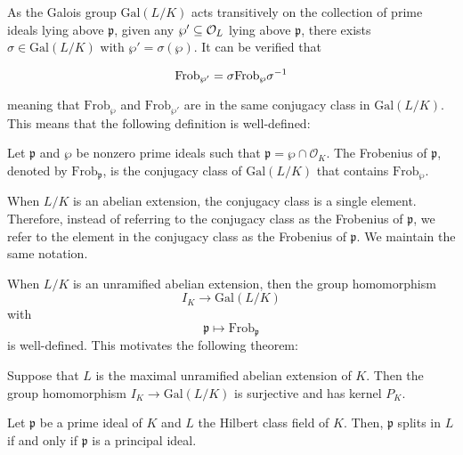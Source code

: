 As the Galois group $\textrm{Gal}(L/K)$ acts transitively on the collection of prime ideals lying above $\mathfrak{p}$, given any $\wp' \subseteq \mathcal{O}_{L}$ lying above $\mathfrak{p}$, there exists $\sigma \in \textrm{Gal}(L/K)$ with $\wp' = \sigma(\wp)$. It can be verified that

\[\textrm{Frob}_{\wp'} = \sigma \textrm{Frob}_\wp\sigma^{-1}\]

meaning that $\textrm{Frob}_{\wp}$ and $\textrm{Frob}_{\wp'}$ are in the same conjugacy class in $\textrm{Gal}(L/K)$. This means that the following definition is well-defined:

\begin{definition}
    Let $\mathfrak{p}$ and $\wp$ be nonzero prime ideals such that $\mathfrak{p} = \wp\cap \mathcal{O}_{K}$. The Frobenius of $\mathfrak{p}$, denoted by $\textrm{Frob}_{\mathfrak{p}}$, is the conjugacy class of $\textrm{Gal}(L/K)$ that contains $\textrm{Frob}_\wp$.
\end{definition}

When $L/K$ is an abelian extension, the conjugacy class is a single element. Therefore, instead of referring to the conjugacy class as the Frobenius of $\mathfrak{p}$, we refer to the element in the conjugacy class as the Frobenius of $\mathfrak{p}$. We maintain the same notation.

When $L/K$ is an unramified abelian extension, then the group homomorphism
    \[I_K \to \textrm{Gal}(L/K)\]
with
    \[\mathfrak{p} \mapsto \textrm{Frob}_{\mathfrak{p}}\]
is well-defined. This motivates the following theorem:

\begin{theorem}
    Suppose that $L$ is the maximal unramified abelian extension of $K$. Then the group homomorphism $I_K \to \textrm{Gal}(L/K)$ is surjective and has kernel $P_K$.
\end{theorem}

\begin{corollary}
    Let $\mathfrak{p}$ be a prime ideal of $K$ and $L$ the Hilbert class field of $K$. Then, $\mathfrak{p}$ splits in $L$ if and only if $\mathfrak{p}$ is a principal ideal.
\end{corollary}